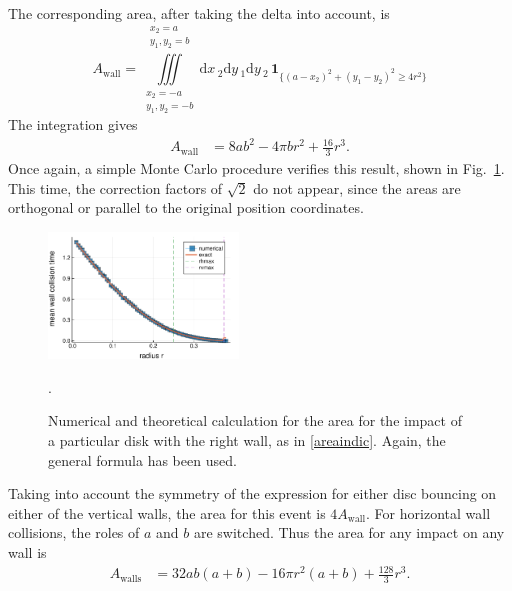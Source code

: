 \documentclass[superscriptaddress,pre,reprint,showpacs,twocolumn]{revtex4-1}
\newcommand{\rd}[1]{\mathrm{d}{#1} \,}
\newcommand{\indicatorsymbol}{\mathbf{1}}
\newcommand{\indicator}[1]{\indicatorsymbol_{ \{   #1 \} } }
\begin{document}
The corresponding area, after taking the delta into account, is
\begin{equation}\label{areaindic}
  A_\mathrm{wall} =  \iiint \limits_ {\substack{x_2 = -a \\ y_1, y_2 = -b }}^
  {\substack{x_2=a\\ y_1,y_2=b}} 
   \rd x_2   \rd y_1   \rd y_2 \, \indicator{ (a-x_2)^2 + (y_1-y_2)^2 \ge 4 r^2 }
\end{equation}
The integration gives
\begin{align}\label{areax1p}
 A_\mathrm{wall} & = 8 a b^2-4  \pi b r^2 +\frac{16}{3}r^3 .
\end{align}
Once again, a simple Monte Carlo procedure verifies this result,
shown in Fig.~\ref{area1derecha}. 
This time, the correction factors of $\sqrt{2}$ do not appear, since
the areas are orthogonal or parallel to the original
position coordinates.


\begin{figure}
\centering
\includegraphics[width=0.45\textwidth]{./figures/areawall01.pdf}
\caption{Numerical and theoretical calculation for the area
for the impact of a particular disk with the right wall, as in \eqref{areaindic}.
Again, the general formula has been used.}
\label{area1derecha}.
\end{figure}

Taking into account the symmetry of the expression for either disc
 bouncing on either of the vertical walls, the
area for this event is  $4A_\text{wall}$. For horizontal wall 
collisions, the roles of $a$ and $b$ are switched.
Thus the area for any impact on any wall is
\begin{align}\label{areawalls}
 A_\text{walls} & = 32 a b (a+b)-16 \pi r^2 (a+b) +\frac{128}{3}r^3.
\end{align}
\end{document}
